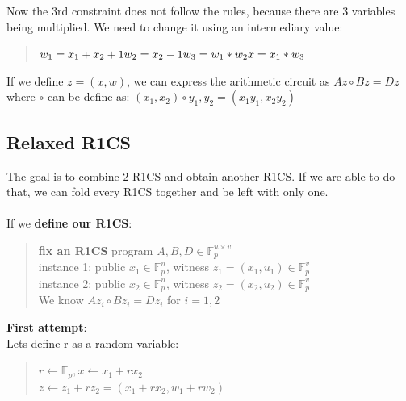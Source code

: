     Now the 3rd constraint does not follow the rules, because there are 3 variables being multiplied.
    We need to change it using an intermediary value:
    
    \begin{quote}
    $w_1 = x_1+x_2+1
    \\
    w_2 = x_2 -1
    \\
    w_3 = w_1*w_2
    \\
    x = x_1*w_3$
    \end{quote}
    \cite{ZKM3}

    If we define $z=(x,w)$, we can express the arithmetic circuit as $ Az \circ Bz = Dz$
    where $\circ$ can be define as: $(x_1, x_2) \circ y_1, y_2 = (x_1y_1, x_2y_2)$
\cite{ZKM10}

\subsection{Relaxed R1CS}
The goal is to combine 2 R1CS and obtain another R1CS. If we are able to do that, we can fold every R1CS together and be left with only one.
\\
\\
If we \textbf{define our R1CS}:
\begin{quote}
\textbf{fix an R1CS} program $A,B,D \in \mathbb{F}^{u \times v}_p $
\\
instance 1: public $ x_1 \in \mathbb{F}^n_p $, witness $ z_1 = (x_1, u_1) \in \mathbb{F}^v_p$
\\
instance 2: public $x_2 \in \mathbb{F}^n_p $, witness $ z_2 = (x_2, u_2) \in \mathbb{F}^v_p$
\\
We know $Az_i \circ Bz_i = Dz_i$ for $ i = 1,2$
\end{quote}

\textbf{First attempt}: 
\\
Lets define r as a random variable:
\begin{quote}
$r \leftarrow \mathbb{F}_p, x \leftarrow x_1+rx_2$ 
\\
$z \leftarrow z_1 + rz_2 = (x_1+rx_2, w_1 + rw_2)$
\end{quote}

